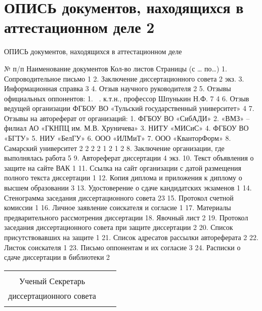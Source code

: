 
\section{ОПИСЬ документов, находящихся в аттестационном деле 2}

ОПИСЬ
документов, находящихся в аттестационном деле
\thesisAuthorLastNameFromFull\

№
п/п	Наименование документов	Кол-во листов	Страницы
(с … по…)
1.		Сопроводительное письмо	1	
2.		Заключение диссертационного совета	2 экз.	
3.		Информационная справка	3	
4.		Отзыв научного руководителя	2	
5.		Отзывы официальных оппонентов:
1. \opponentOneRegaliaShort\ . к.т.н., профессор Шпунькин Н.Ф.	
7
4	
6.		Отзыв ведущей организации ФГБОУ ВО «Тульский государственный университет»	4	
7.		Отзывы на автореферат от организаций:
1. ФГБОУ ВО «СибАДИ»
2. «ВМЗ» – филиал АО «ГКНПЦ им. М.В. Хруничева»
3. НИТУ «МИСиС»
4. ФГБОУ ВО «БГТУ»
5. НИУ «БелГУ»
6. ООО «ИЛМиТ»
7. ООО «КванторФорм»
8. Самарский университет	
2
2
2
2
1
2
1
2	
8.		Заключение организации, где выполнялась работа	5	
9.		Автореферат диссертации	4 экз.	
10.		Текст объявления о защите на сайте ВАК	1	
11.		Ссылка на сайт организации с датой размещения полного текста диссертации	1	
12.		Копия диплома и приложения к диплому о высшем образовании	3	
13.		Удостоверение о сдаче кандидатских экзаменов	1	
14.		Стенограмма заседания диссертационного совета	23	
15.		Протокол счетной комиссии	1	
16.		Личное заявление соискателя и согласие	1	
17.		Материалы предварительного рассмотрения диссертации		
18.		Явочный лист	2	
19.		Протокол заседания диссертационного совета при защите диссертации	2	
20.		Список присутствовавших на защите	1	
21.		Список адресатов рассылки автореферата	2	
22.		Листок соискателя	1	
23.		Письмо оппонентам и их согласие	3	
24.		Расписки о сдаче диссертации в библиотеки	2

	
\begin{center}
	\begin{tabular}[c]{c m{4cm} l}
		&            &                     \\
		Ученый Секретарь     &            &                     \\
		диссертационного совета & \hrulefill & \dcSecretaryFullFIO \\
		\dcSecretaryRegalia   &            &
	\end{tabular}
\end{center}


\clearpage
